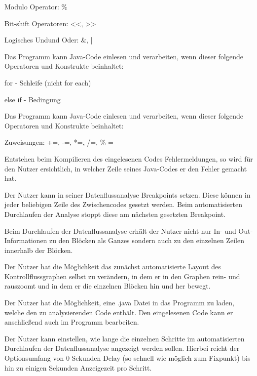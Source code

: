 Modulo Operator: \%

Bit-shift Operatoren: <<, >>

Logisches \glqq Und\grqq und \glqq Oder\grqq : \&, |

Das Programm kann Java-Code einlesen und verarbeiten, wenn dieser folgende Operatoren und Konstrukte beinhaltet:

for - Schleife (nicht for each)

else if - Bedingung

Das Programm kann Java-Code einlesen und verarbeiten, wenn dieser folgende Operatoren und Konstrukte beinhaltet:

Zuweisungen: +=, -=, *=, /=, \% =

Entstehen beim Kompilieren des eingelesenen Codes Fehlermeldungen, so wird für den Nutzer ersichtlich, in welcher Zeile seines Java-Codes er den Fehler gemacht hat.

Der Nutzer kann in seiner Datenflussanalyse Breakpoints setzen. Diese können in jeder beliebigen Zeile des Zwischencodes gesetzt werden. Beim automatisierten Durchlaufen der Analyse stoppt diese am nächsten gesetzten Breakpoint.

Beim Durchlaufen der Datenflussanalyse erhält der Nutzer nicht nur In- und Out-
Informationen zu den Blöcken als Ganzes sondern auch zu den einzelnen Zeilen
innerhalb der Blöcken.

Der Nutzer hat die Möglichkeit das zunächst automatisierte Layout des
Kontrollflussgraphen selbst zu verändern, in dem er in den Graphen rein- und
rauszoomt und in dem er die einzelnen Blöcken hin und her bewegt.

Der Nutzer hat die Möglichkeit, eine .java Datei in das Programm zu laden, welche
den zu analysierenden Code enthält. Den eingelesenen Code kann er anschließend
auch im Programm bearbeiten.

Der Nutzer kann einstellen, wie lange die einzelnen Schritte im automatisierten
Durchlaufen der Datenflussanalyse angezeigt werden sollen. Hierbei reicht der
Optionsumfang von 0 Sekunden Delay (so schnell wie möglich zum Fixpunkt) bis hin
zu einigen Sekunden Anzeigezeit pro Schritt.

